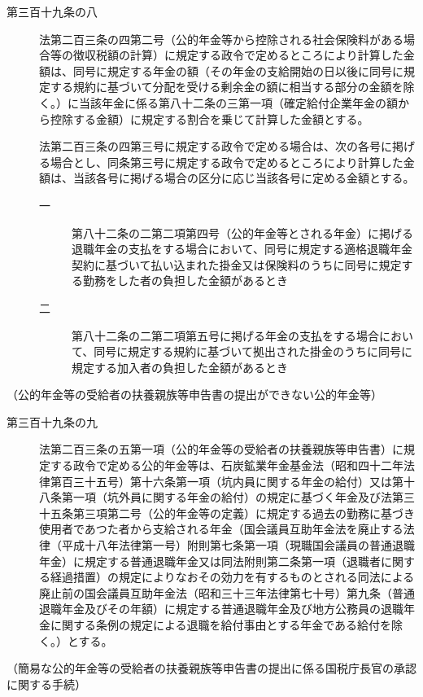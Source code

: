 \documentclass[twocolumn,a4j,10pt]{ltjtarticle}
\begin{document}
\begin{description}
\item[第三百十九条の八]法第二百三条の四第二号（公的年金等から控除される社会保険料がある場合等の徴収税額の計算）に規定する政令で定めるところにより計算した金額は、同号に規定する年金の額（その年金の支給開始の日以後に同号に規定する規約に基づいて分配を受ける剰余金の額に相当する部分の金額を除く。）に当該年金に係る第八十二条の三第一項（確定給付企業年金の額から控除する金額）に規定する割合を乗じて計算した金額とする。
\item[]法第二百三条の四第三号に規定する政令で定める場合は、次の各号に掲げる場合とし、同条第三号に規定する政令で定めるところにより計算した金額は、当該各号に掲げる場合の区分に応じ当該各号に定める金額とする。
\begin{description}
\item[一]第八十二条の二第二項第四号（公的年金等とされる年金）に掲げる退職年金の支払をする場合において、同号に規定する適格退職年金契約に基づいて払い込まれた掛金又は保険料のうちに同号に規定する勤務をした者の負担した金額があるとき
\item[二]第八十二条の二第二項第五号に掲げる年金の支払をする場合において、同号に規定する規約に基づいて拠出された掛金のうちに同号に規定する加入者の負担した金額があるとき
\end{description}
\end{description}
\noindent\hspace{10pt}（公的年金等の受給者の扶養親族等申告書の提出ができない公的年金等）
\begin{description}
\item[第三百十九条の九]法第二百三条の五第一項（公的年金等の受給者の扶養親族等申告書）に規定する政令で定める公的年金等は、石炭鉱業年金基金法（昭和四十二年法律第百三十五号）第十六条第一項（坑内員に関する年金の給付）又は第十八条第一項（坑外員に関する年金の給付）の規定に基づく年金及び法第三十五条第三項第二号（公的年金等の定義）に規定する過去の勤務に基づき使用者であつた者から支給される年金（国会議員互助年金法を廃止する法律（平成十八年法律第一号）附則第七条第一項（現職国会議員の普通退職年金）に規定する普通退職年金又は同法附則第二条第一項（退職者に関する経過措置）の規定によりなおその効力を有するものとされる同法による廃止前の国会議員互助年金法（昭和三十三年法律第七十号）第九条（普通退職年金及びその年額）に規定する普通退職年金及び地方公務員の退職年金に関する条例の規定による退職を給付事由とする年金である給付を除く。）とする。
\end{description}
\noindent\hspace{10pt}（簡易な公的年金等の受給者の扶養親族等申告書の提出に係る国税庁長官の承認に関する手続）
\end{document}
